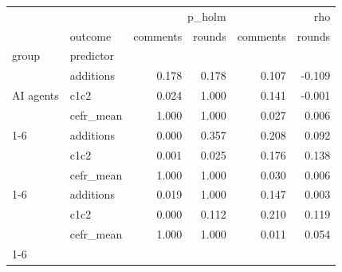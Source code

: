 \begin{tabular}{llrrrr}
\toprule
 &  & \multicolumn{2}{r}{p_holm} & \multicolumn{2}{r}{rho} \\
 & outcome & comments & rounds & comments & rounds \\
group & predictor &  &  &  &  \\
\midrule
\multirow[t]{3}{*}{AI agents} & additions & 0.178 & 0.178 & 0.107 & -0.109 \\
 & c1c2 & 0.024 & 1.000 & 0.141 & -0.001 \\
 & cefr_mean & 1.000 & 1.000 & 0.027 & 0.006 \\
\cline{1-6}
\multirow[t]{3}{*}{Human} & additions & 0.000 & 0.357 & 0.208 & 0.092 \\
 & c1c2 & 0.001 & 0.025 & 0.176 & 0.138 \\
 & cefr_mean & 1.000 & 1.000 & 0.030 & 0.006 \\
\cline{1-6}
\multirow[t]{3}{*}{Human (pre-ChatGPT)} & additions & 0.019 & 1.000 & 0.147 & 0.003 \\
 & c1c2 & 0.000 & 0.112 & 0.210 & 0.119 \\
 & cefr_mean & 1.000 & 1.000 & 0.011 & 0.054 \\
\cline{1-6}
\bottomrule
\end{tabular}
